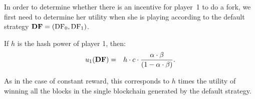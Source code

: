 In order to determine whether there is an incentive for player~1 to do a fork, we first need to determine her utility when she is playing according to the default strategy $\text{\rm {\bf DF}} = (\text{\rm DF}_0,\text{\rm DF}_1)$. 

\begin{lemma}\label{lem:default_utility}
If $h$ is the hash power of player 1, then:
\begin{eqnarray*}
u_1(\text{\rm {\bf DF}}) & = & h\cdot c\cdot\frac{\alpha\cdot\beta}{(1-\alpha\cdot\beta)}.
\end{eqnarray*}
\end{lemma}
As in the case of constant reward, this corresponds to $h$ times the utility of winning all the blocks in the single blockchain generated by the default strategy.


